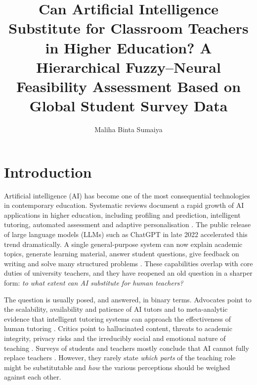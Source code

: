 \documentclass[fleqn,10pt]{wlscirep}
\title{Can Artificial Intelligence Substitute for Classroom Teachers in Higher Education? A Hierarchical Fuzzy--Neural Feasibility Assessment Based on Global Student Survey Data}
\author[1,*]{Maliha Binta Sumaiya}
\affil[1]{Department of Computer Science and Engineering, [University name], [City], [Country] (E-mail: 4notebk@gmail.com)}
\affil[*]{Corresponding Author: Maliha Binta Sumaiya (4notebk@gmail.com)}
\theoremstyle{remark}
\begin{document}
\flushbottom
\maketitle
\thispagestyle{empty}

\section{Introduction}
\label{sec:intro}

Artificial intelligence (AI) has become one of the most consequential technologies in contemporary education. Systematic reviews document a rapid growth of AI applications in higher education, including profiling and prediction, intelligent tutoring, automated assessment and adaptive personalisation \cite{zawacki2019,crompton2023,bond2024}. The public release of large language models (LLMs) such as ChatGPT in late 2022 accelerated this trend dramatically. A single general-purpose system can now explain academic topics, generate learning material, answer student questions, give feedback on writing and solve many structured problems \cite{kasneci2023,dwivedi2023}. These capabilities overlap with core duties of university teachers, and they have reopened an old question in a sharper form: \emph{to what extent can AI substitute for human teachers?} \cite{selwyn2019,popenici2017}

The question is usually posed, and answered, in binary terms. Advocates point to the scalability, availability and patience of AI tutors and to meta-analytic evidence that intelligent tutoring systems can approach the effectiveness of human tutoring \cite{vanlehn2011,kulik2016}. Critics point to hallucinated content, threats to academic integrity, privacy risks and the irreducibly social and emotional nature of teaching \cite{rudolph2023,cotton2024,unesco2023}. Surveys of students and teachers mostly conclude that AI cannot fully replace teachers \cite{chantsi2024,chanhu2023}. However, they rarely state \emph{which parts} of the teaching role might be substitutable and \emph{how} the various perceptions should be weighed against each other.
\end{document}
